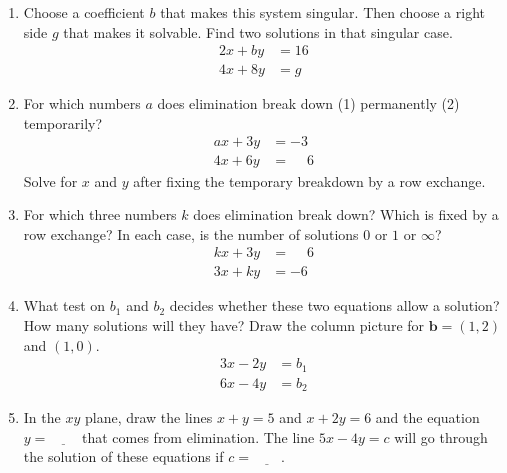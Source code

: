 \documentclass[14pt, a4paper]{article}
\begin{document}
\begin{enumerate}
    \item Choose a coefficient $b$ that makes this system singular. Then choose a right side $g$ that makes it solvable. Find two solutions in that singular case.
          \[
              \begin{aligned}
                  2x + by & = 16 \\
                  4x + 8y & = g
              \end{aligned}
          \]

    \item For which numbers $a$ does elimination break down (1) permanently (2) temporarily?
          \[
              \begin{aligned}
                  ax + 3y & = -3           \\
                  4x + 6y & = \phantom{-}6
              \end{aligned}
          \]
          Solve for $x$ and $y$ after fixing the temporary breakdown by a row exchange.

    \item For which three numbers $k$ does elimination break down? Which is fixed by a row exchange? In each case, is the number of solutions $0$ or $1$ or $\infty$?
          \[
              \begin{aligned}
                  kx + 3y & = \phantom{-}6 \\
                  3x + ky & = -6
              \end{aligned}
          \]

    \item What test on $b_1$ and $b_2$ decides whether these two equations allow a solution? How many solutions will they have? Draw the column picture for $\boldsymbol{b} = (1,2)$ and $(1,0)$.
          \[
              \begin{aligned}
                  3x - 2y & = b_1 \\
                  6x - 4y & = b_2
              \end{aligned}
          \]

    \item In the $xy$ plane, draw the lines $x+y=5$ and $x+2y=6$ and the equation $y = \underline{\hspace{2em}}$ that comes from elimination. The line $5x - 4y = c$ will go through the solution of these equations if $c = \underline{\hspace{2em}}$.
\end{enumerate}
\end{document}
